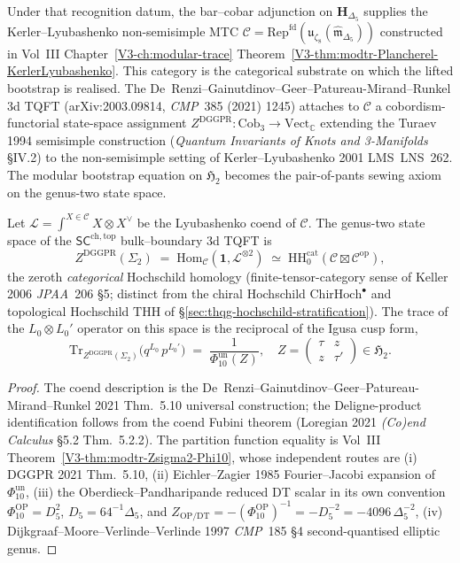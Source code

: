 Under that recognition datum, the bar--cobar adjunction on
$\mathbf H_{\Delta_5}$ supplies the Kerler--Lyubashenko
non-semisimple MTC
$\mathcal C = \mathrm{Rep}^{\mathrm{fd}}(\mathfrak u_{\zeta_8}
(\widehat{\mathfrak m}_{\Delta_5}))$ constructed in
Vol~III Chapter~\ref{V3-ch:modular-trace}
Theorem~\ref{V3-thm:modtr-Plancherel-KerlerLyubashenko}. This category
is the categorical substrate on which the lifted bootstrap is realised.
The
De~Renzi--Gainutdinov--Geer--Patureau-Mirand--Runkel 3d TQFT
(arXiv:2003.09814, \emph{CMP}~385 (2021) 1245) attaches to $\mathcal C$ a
cobordism-functorial state-space assignment
$Z^{\mathrm{DGGPR}}\colon\mathrm{Cob}_3\to\mathrm{Vect}_{\mathbb C}$
extending the Turaev 1994 semisimple construction
(\emph{Quantum Invariants of Knots and 3-Manifolds}
\S IV.2) to the non-semisimple setting of Kerler--Lyubashenko 2001
LMS~LNS~262. The modular bootstrap equation on $\mathfrak H_2$ becomes
the pair-of-pants sewing axiom on the genus-two state space.

\begin{theorem}
\label{thm:modbootstrap-Zsigma2-bootstrap}
Let $\mathcal L = \int^{X\in\mathcal C} X\otimes X^\vee$ be the
Lyubashenko coend of $\mathcal C$. The genus-two state space of the
$\mathsf{SC}^{\mathrm{ch,top}}$ bulk--boundary 3d TQFT is
\[
 Z^{\mathrm{DGGPR}}(\Sigma_2)
 \;=\;
 \mathrm{Hom}_{\mathcal C}(\mathbf 1, \mathcal L^{\otimes 2})
 \;\simeq\;
 \mathrm{HH}_0^{\mathrm{cat}}
 (\mathcal C\boxtimes\mathcal C^{\mathrm{op}}),
\]
the zeroth \emph{categorical} Hochschild homology
(finite-tensor-category sense of Keller 2006 \emph{JPAA}~206 \S5;
distinct from the chiral Hochschild
$\mathrm{ChirHoch}^\bullet$ and topological Hochschild
$\mathrm{THH}$ of
\S\ref{sec:thqg-hochschild-stratification}).
The trace of the $L_0\otimes L_0'$ operator on this space is the
reciprocal of the Igusa cusp form,
\[
 \boxed{\;
 \mathrm{Tr}_{Z^{\mathrm{DGGPR}}(\Sigma_2)}
 \!\bigl(q^{L_0}\,p^{L_0'}\bigr)
 \;=\;
 \frac{1}{\Phi_{10}^{\mathrm{un}}(Z)},
 \quad
 Z = \begin{pmatrix}\tau & z\\ z & \tau'\end{pmatrix}\in\mathfrak H_2.\;}
\]
\end{theorem}

\begin{proof}
The coend description is the De~Renzi--Gainutdinov--Geer--Patureau-Mirand--Runkel
2021 Thm.~5.10 universal construction; the Deligne-product identification
follows from the coend Fubini theorem
(Loregian 2021 \emph{(Co)end Calculus} \S 5.2 Thm.~5.2.2). The partition
function equality is Vol~III
Theorem~\ref{V3-thm:modtr-Zsigma2-Phi10}, whose independent
routes are (i) DGGPR 2021 Thm.~5.10, (ii) Eichler--Zagier 1985
Fourier--Jacobi expansion of $\Phi_{10}^{\mathrm{un}}$, (iii) the
Oberdieck--Pandharipande reduced DT scalar in its own convention
$\Phi_{10}^{\mathrm{OP}}=D_5^2$,
$D_5=64^{-1}\Delta_5$, and
$Z_{\mathrm{OP/DT}}=-(\Phi_{10}^{\mathrm{OP}})^{-1}
=-D_5^{-2}=-4096\,\Delta_5^{-2}$,
(iv) Dijkgraaf--Moore--Verlinde--Verlinde 1997 \emph{CMP}~185 \S 4
second-quantised elliptic genus.
\end{proof}

